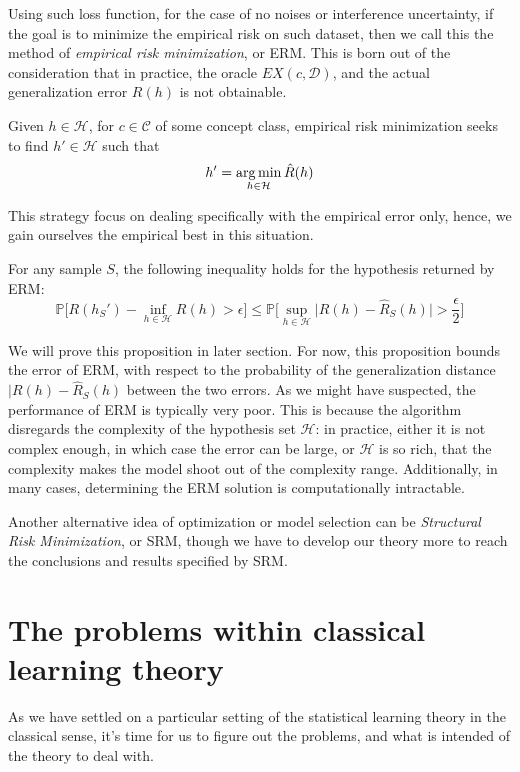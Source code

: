 Using such loss function, for the case of no noises or interference uncertainty, if the goal is to minimize the empirical risk on such dataset, then we call this the method of \textit{empirical risk minimization}, or ERM. This is born out of the consideration that in practice, the oracle $EX(c,\mathcal{D})$, and the actual generalization error $R(h)$ is not obtainable. 

\begin{definition}
    Given $h\in \mathcal{H}$, for $c\in \mathcal{C}$ of some concept class, empirical risk minimization seeks to find $h'\in\mathcal{H}$ such that \begin{equation}
        h' = \operatorname*{arg\,min}_{h\in \mathcal{H}} \hat{R}(h)
    \end{equation}
\end{definition}
This strategy focus on dealing specifically with the empirical error only, hence, we gain ourselves the empirical best in this situation. 
\begin{proposition}
    For any sample $S$, the following inequality holds for the hypothesis returned by ERM: 
    \begin{equation}
        \mathbb{P}\Big[R(h_{S}')- \inf_{h\in \mathcal{H}}R(h) > \epsilon\Big] \leq \mathbb{P}\Big[ \sup_{h\in \mathcal{H}} \lvert R(h)- \hat{R}_{S}(h) \rvert > \frac{\epsilon}{2} \Big]
    \end{equation}
\end{proposition}
We will prove this proposition in later section. For now, this proposition bounds the error of ERM, with respect to the probability of the generalization distance $\lvert R(h)- \hat{R}_{S}(h)$ between the two errors. As we might have suspected, the performance of ERM is typically very poor. This is because the algorithm disregards the complexity of the hypothesis set $\mathcal{H}$: in practice, either it is not complex enough, in which case the error can be large, or $\mathcal{H}$ is so rich, that the complexity makes the model shoot out of the complexity range. Additionally, in many cases, determining the ERM solution is computationally intractable. 

Another alternative idea of optimization or model selection can be \textit{Structural Risk Minimization}, or SRM, though we have to develop our theory more to reach the conclusions and results specified by SRM. 

\section{The problems within classical learning theory}\label{sec:LearningProblems}
As we have settled on a particular setting of the statistical learning theory in the classical sense, it's time for us to figure out the problems, and what is intended of the theory to deal with. 

